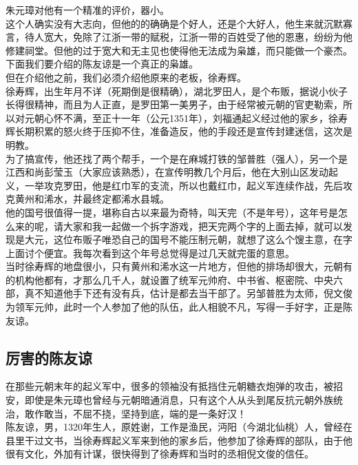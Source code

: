 \begin{multicols}{\theparacolNo}
朱元璋对他有一个精准的评价，器小。\\

这个人确实没有大志向，但他的的确确是个好人，还是个大好人，他生来就沉默寡言，待人宽大，免除了江浙一带的赋税，江浙一带的百姓受了他的恩惠，纷纷为他修建祠堂。但他的过于宽大和无主见也使得他无法成为枭雄，而只能做一个豪杰。\\

下面我们要介绍的陈友谅是一个真正的枭雄。\\

但在介绍他之前，我们必须介绍他原来的老板，徐寿辉。\\

徐寿辉，出生年月不详（死期倒是很精确），湖北罗田人，是个布贩，据说小伙子长得很精神，而且为人正直，是罗田第一美男子，由于经常被元朝的官吏勒索，所以对元朝心怀不满，至正十一年（公元1351年），刘福通起义经过他的家乡，徐寿辉长期积累的怒火终于压抑不住，准备造反，他的手段还是宣传封建迷信，这次是明教。\\

为了搞宣传，他还找了两个帮手，一个是在麻城打铁的邹普胜（强人），另一个是江西和尚彭莹玉（大家应该熟悉），在宣传明教几个月后，他在大别山区发动起义，一举攻克罗田，他是红巾军的支流，所以也戴红巾，起义军连续作战，先后攻克黄州和浠水，并最终定都浠水县城。\\

他的国号很值得一提，堪称自古以来最为奇特，叫天完（不是年号），这年号是怎么来的呢，请大家和我一起做一个拆字游戏，把天完两个字的上面去掉，就可以发现是大元，这位布贩子唯恐自己的国号不能压制元朝，就想了这么个馊主意，在字上面讨个便宜。我每次看到这个年号总觉得是过几天就完蛋的意思。\\

当时徐寿辉的地盘很小，只有黄州和浠水这一片地方，但他的排场却很大，元朝有的机构他都有，才那么几千人，就设置了统军元帅府、中书省、枢密院、中央六部，真不知道他手下还有没有兵，估计是都去当干部了。另邹普胜为太师，倪文俊为领军元帅，此时一个人参加了他的队伍，此人相貌不凡，写得一手好字，正是陈友谅。\\

\subsection{厉害的陈友谅}
在那些元朝末年的起义军中，很多的领袖没有抵挡住元朝糖衣炮弹的攻击，被招安，即使是朱元璋也曾经与元朝暗通消息，只有这个人从头到尾反抗元朝外族统治，敢作敢当，不屈不挠，坚持到底，端的是一条好汉！\\

陈友谅，男，1320年生人，原姓谢，工作是渔民，沔阳（今湖北仙桃）人，曾经在县里干过文书，当徐寿辉起义军来到他的家乡后，他参加了徐寿辉的部队，由于他很有文化，外加有计谋，很快得到了徐寿辉和当时的丞相倪文俊的信任。\\


\end{multicols}
